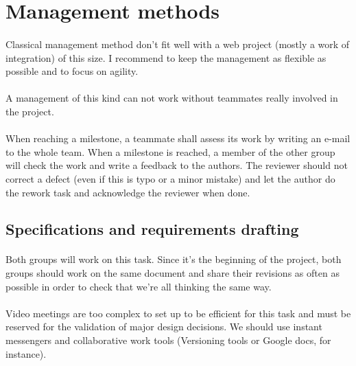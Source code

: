 \section{Management methods}

\paragraph{} Classical management method don't fit well with a web project
(mostly a work of integration) of this size. I recommend to keep the management
as flexible as possible and to focus on agility.

\paragraph{} A management of this kind can not work without teammates really
involved in the project.

\paragraph{} When reaching a milestone, a teammate shall assess its work by
writing an e-mail to the whole team. When a milestone is reached, a member of
the other group will check the work and write a feedback to the authors. The
reviewer should not correct a defect (even if this is typo or a minor mistake)
and let the author do the rework task and acknowledge the reviewer when done.

\subsection{Specifications and requirements drafting}

\paragraph{} Both groups will work on this task. Since it's the beginning of the
project, both groups should work on the same document and share their revisions
as often as possible in order to check that we're all thinking the same way.

\paragraph{} Video meetings are too complex to set up to be efficient for this
task and must be reserved for the validation of major design decisions. We
should use instant messengers and collaborative work tools (Versioning tools or
Google docs, for instance).

